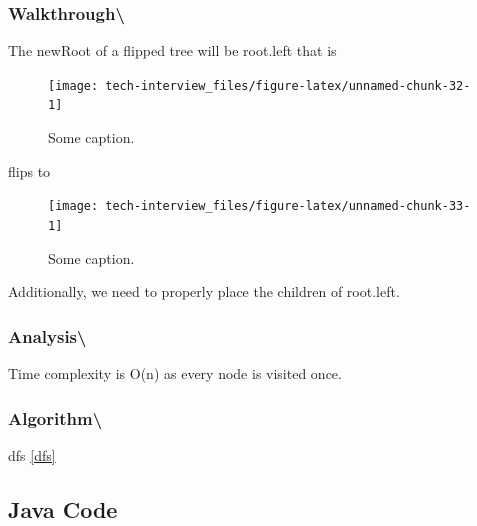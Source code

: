\documentclass[]{book}
\begin{document}
\hypertarget{walkthrough-80}{%
\subsubsection{Walkthrough\textbackslash{}}\label{walkthrough-80}}

The newRoot of a flipped tree will be root.left that is

\begin{figure}
\texttt{[image: tech-interview\_files/figure-latex/unnamed-chunk-32-1]} \caption{Some caption.}\label{fig:unnamed-chunk-32}
\end{figure}

flips to

\begin{figure}
\texttt{[image: tech-interview\_files/figure-latex/unnamed-chunk-33-1]} \caption{Some caption.}\label{fig:unnamed-chunk-33}
\end{figure}

Additionally, we need to properly place the children of root.left.

\hypertarget{analysis-87}{%
\subsubsection{Analysis\textbackslash{}}\label{analysis-87}}

Time complexity is O(n) as every node is visited once.

\hypertarget{algorithm-88}{%
\subsubsection{Algorithm\textbackslash{}}\label{algorithm-88}}

dfs \ref{dfs}

\hypertarget{java-code-50}{%
\subsection{Java Code}\label{java-code-50}}
\end{document}
